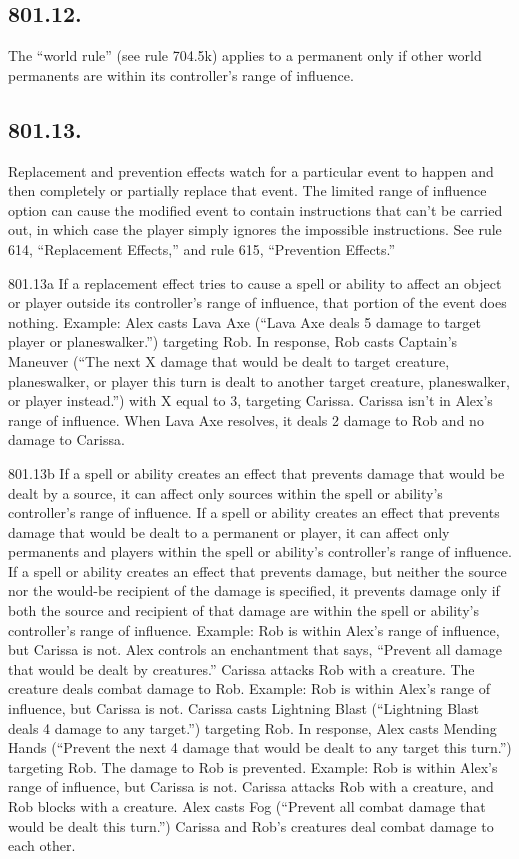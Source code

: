 \subsection*{801.12.}
The “world rule” (see rule 704.5k) applies to a permanent only if other world permanents are within its controller’s range of influence.

\subsection*{801.13.}
Replacement and prevention effects watch for a particular event to happen and then completely or partially replace that event. The limited range of influence option can cause the modified event to contain instructions that can’t be carried out, in which case the player simply ignores the impossible instructions. See rule 614, “Replacement Effects,” and rule 615, “Prevention Effects.”

801.13a If a replacement effect tries to cause a spell or ability to affect an object or player outside its controller’s range of influence, that portion of the event does nothing.
Example: Alex casts Lava Axe (“Lava Axe deals 5 damage to target player or planeswalker.”) targeting Rob. In response, Rob casts Captain’s Maneuver (“The next X damage that would be dealt to target creature, planeswalker, or player this turn is dealt to another target creature, planeswalker, or player instead.”) with X equal to 3, targeting Carissa. Carissa isn’t in Alex’s range of influence. When Lava Axe resolves, it deals 2 damage to Rob and no damage to Carissa.

801.13b If a spell or ability creates an effect that prevents damage that would be dealt by a source, it can affect only sources within the spell or ability’s controller’s range of influence. If a spell or ability creates an effect that prevents damage that would be dealt to a permanent or player, it can affect only permanents and players within the spell or ability’s controller’s range of influence. If a spell or ability creates an effect that prevents damage, but neither the source nor the would-be recipient of the damage is specified, it prevents damage only if both the source and recipient of that damage are within the spell or ability’s controller’s range of influence.
Example: Rob is within Alex’s range of influence, but Carissa is not. Alex controls an enchantment that says, “Prevent all damage that would be dealt by creatures.” Carissa attacks Rob with a creature. The creature deals combat damage to Rob.
Example: Rob is within Alex’s range of influence, but Carissa is not. Carissa casts Lightning Blast (“Lightning Blast deals 4 damage to any target.”) targeting Rob. In response, Alex casts Mending Hands (“Prevent the next 4 damage that would be dealt to any target this turn.”) targeting Rob. The damage to Rob is prevented.
Example: Rob is within Alex’s range of influence, but Carissa is not. Carissa attacks Rob with a creature, and Rob blocks with a creature. Alex casts Fog (“Prevent all combat damage that would be dealt this turn.”) Carissa and Rob’s creatures deal combat damage to each other.

